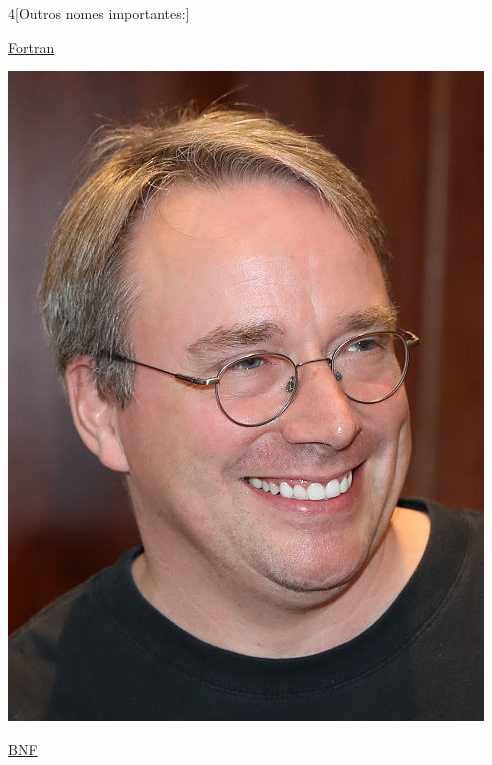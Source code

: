 \begin{multicols}{4}[Outros nomes importantes:]
\vfill\null
\columnbreak				
				
				\href{https://pt.wikipedia.org/wiki/Fortran}{Fortran}
				
\begin{center}
					\includegraphics[width=.8\columnwidth]{./IMG-GIT/CIENTISTAS/linus.jpeg}
\end{center}
				
\vfill\null
\columnbreak				
				
				\href{https://pt.wikipedia.org/wiki/BNF}{BNF}
				

\end{multicols}
